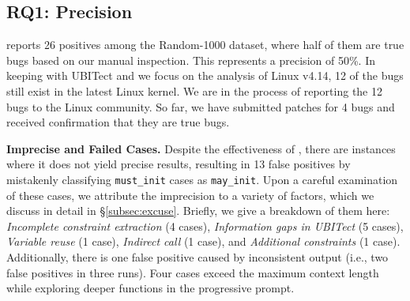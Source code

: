 \subsection{RQ1: Precision}
\label{subsec:expr_precision}



\work reports 26 positives among the Random-1000 dataset, where half of them are true bugs based on our manual inspection. This represents a precision of 50\%.
In keeping with UBITect and we focus on the analysis of Linux v4.14,  12 of the bugs still exist in the latest Linux kernel.
We are in the process of reporting the 12 bugs to the Linux community.
So far, we have submitted patches for 4 bugs and received confirmation that they are true bugs.


\vspace{3pt}
\noindent
\textbf{Imprecise and Failed Cases.} 
 Despite the effectiveness of \work, there are instances where it does not yield precise results, resulting in 13 false positives by mistakenly classifying \texttt{must\_init} cases as \texttt{may\_init}. Upon a careful examination of these cases, we attribute the imprecision to a variety of factors, which we discuss in detail in \S\ref{subsec:excuse}.
 Briefly, we give a breakdown of them here: \textit{Incomplete constraint extraction} (4 cases), \textit{Information gaps in UBITect} (5 cases), \textit{Variable reuse} (1 case), \textit{Indirect call} (1 case), and \textit{Additional constraints} (1 case). Additionally, there is one false positive caused by inconsistent output (i.e., two false positives in three runs). 
 Four cases exceed the maximum context length while exploring deeper functions in the progressive prompt. %






